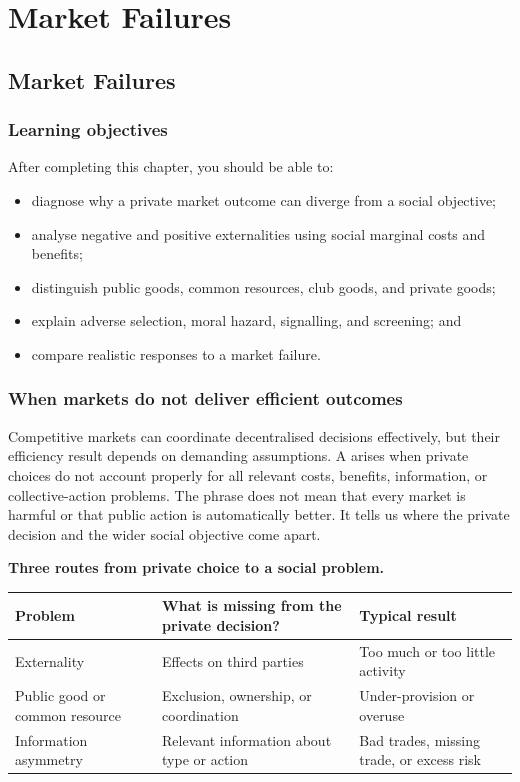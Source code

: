 \part{Market Failures}

\chapter{Market Failures}
\label{chap:market-failures}

\section{Learning objectives}

After completing this chapter, you should be able to:
\begin{itemize}
  \item diagnose why a private market outcome can diverge from a social objective;
  \item analyse negative and positive externalities using social marginal costs and benefits;
  \item distinguish public goods, common resources, club goods, and private goods;
  \item explain adverse selection, moral hazard, signalling, and screening; and
  \item compare realistic responses to a market failure.
\end{itemize}

\section{When markets do not deliver efficient outcomes}

Competitive markets can coordinate decentralised decisions effectively, but
their efficiency result depends on demanding assumptions. A  arises when private choices do not account properly for all relevant
costs, benefits, information, or collective-action problems. The phrase does
not mean that every market is harmful or that public action is automatically
better. It tells us where the private decision and the wider social objective
come apart.

\begin{keyidea}
\textbf{Three routes from private choice to a social problem.}
\begin{center}
\small
\begin{tabular}{@{}p{3.1cm}p{4.6cm}p{4.2cm}@{}}
\toprule
Problem & What is missing from the private decision? & Typical result \\
\midrule
Externality & Effects on third parties & Too much or too little activity \\
Public good or common resource & Exclusion, ownership, or coordination & Under-provision or overuse \\
Information asymmetry & Relevant information about type or action & Bad trades, missing trade, or excess risk \\
\bottomrule
\end{tabular}
\end{center}
\end{keyidea}

